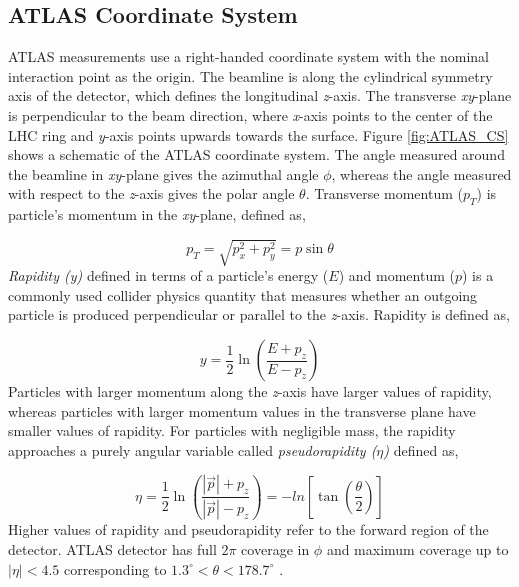 \subsection{ATLAS Coordinate System}
\label{subsec:ATLASCS}

ATLAS measurements use a right-handed coordinate system with the nominal interaction point as the origin. The beamline is along the cylindrical symmetry axis of the detector, which defines the longitudinal \textit{z}-axis. The transverse \textit{xy}-plane is perpendicular to the beam direction, where \textit{x}-axis points to the center of the LHC ring and \textit{y}-axis points upwards towards the surface. Figure \ref{fig:ATLAS_CS} shows a schematic of the ATLAS coordinate system. The angle measured around the beamline in \textit{xy}-plane gives the azimuthal angle $\phi$, whereas the angle measured with respect to the \textit{z}-axis gives the polar angle $\theta$. Transverse momentum ($p_{T}$) is particle's momentum in the \textit{xy}-plane, defined as, 

\begin{equation}
p_{T} = \sqrt{p_{x}^2+p_{y}^2}=p\sin\theta
\label{eqn:pT}
\end{equation}
\textit{Rapidity (y)} defined in terms of a particle's energy ($E$) and momentum ($p$) is a commonly used collider physics quantity that measures whether an outgoing particle is produced perpendicular or parallel to the \textit{z}-axis. Rapidity is defined as, 

\begin{equation}
    y = \frac{1}{2}\ln{ \left( \frac{E+p_{z}}{E-p_{z}} \right) }
    \label{eqn:Rapidity}
\end{equation}
Particles with larger momentum along the \textit{z}-axis have larger values of rapidity, whereas particles with larger momentum values in the transverse plane have smaller values of rapidity. For particles with negligible mass, the rapidity approaches a purely angular variable called \textit{pseudorapidity ($\eta$)} defined as, 

\begin{equation}
    \eta = \frac{1}{2}\ln{ \left( \frac{ |\vec{p}|+p_{z}}{ |\vec{p}| -p_{z}} \right) } = -ln { \left[ \tan \left( \frac{\theta}{2}\right) \right] } 
    \label{eqn:PseudoRapidity}
\end{equation}
Higher values of rapidity and pseudorapidity refer to the forward region of the detector. ATLAS detector has full $2\pi$ coverage in $\phi$ and maximum coverage up to $|\eta| < 4.5$ corresponding to $1.3^{\circ} < \theta < 178.7^{\circ} $ \cite{ATLAS}. 

